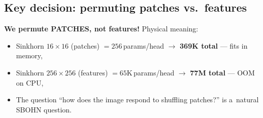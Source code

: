 \subsection{Key decision: permuting patches vs.\ features}

\textbf{We permute PATCHES, not features!} Physical meaning:
\begin{itemize}
\item Sinkhorn $16{\times}16$ (patches) $= 256$\,params/head $\to$ \textbf{369K total} --- fits in memory,
\item Sinkhorn $256{\times}256$ (features) $= 65$K\,params/head $\to$ \textbf{77M total} --- OOM on CPU,
\item The question ``how does the image respond to shuffling patches?'' is a~natural SBOHN question.
\end{itemize}
